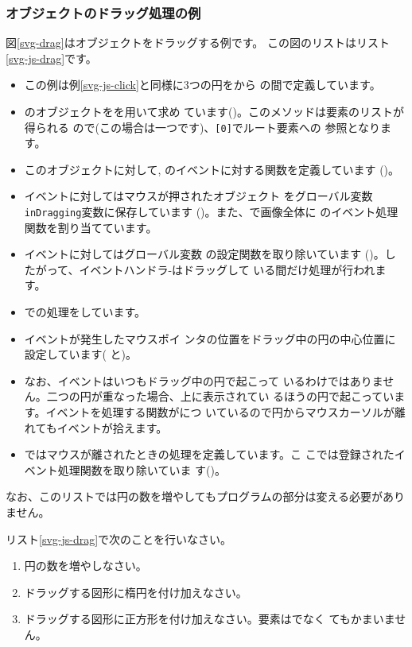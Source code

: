 \subsubsection{オブジェクトのドラッグ処理の例}
図\ref{svg-drag}はオブジェクトをドラッグする例です。
この図のリストはリスト\ref{svg-js-drag}です。
{}
\begin{itemize}
 \item この例は例\ref{svg-js-click}と同様に3つの円をから
       の間で定義しています。
 \item {}のオブジェクトをを用いて求め
       ています()。このメソッドは要素のリストが得られる
       ので(この場合は一つです)、\texttt{[0]}でルート要素への
       参照となります。
 \item このオブジェクトに対して, %
        のイベントに対する関数を定義しています%
       ()。
 \item {}イベントに対してはマウスが押されたオブジェクト
       をグローバル変数\texttt{inDragging}変数に保存しています
       ()。また、で画像全体に
       のイベント処理関数を割り当てています。
 \item {}イベントに対してはグローバル変数
       の設定関数を取り除いています
       ()。したがって、イベントハンドラ-はドラッグして
       いる間だけ処理が行われます。
 \item {}での処理をしています。
 \item イベントが発生したマウスポイ
       ンタの位置をドラッグ中の円の中心位置に設定しています(
       と)。
 \item なお、イベントはいつもドラッグ中の円で起こって
       いるわけではありません。二つの円が重なった場合、上に表示されてい
       るほうの円で起こっています。イベントを処理する関数がにつ
       いているので円からマウスカーソルが離れてもイベントが拾えます。
 \item {}ではマウスが離されたときの処理を定義しています。こ
       こでは登録されたイベント処理関数を取り除いていま
       す()。
\end{itemize}
なお、このリストでは円の数を増やしてもプログラムの部分は変える必要があり
ません。
\begin{Problem}\upshape\label{check-drag-prob}
 リスト\ref{svg-js-drag}で次のことを行いなさい。
\begin{enumerate}
 \item 円の数を増やしなさい。
 \item ドラッグする図形に楕円を付け加えなさい。
 \item ドラッグする図形に正方形を付け加えなさい。要素はでなく
       てもかまいません。
 \end{enumerate}
\end{Problem}

